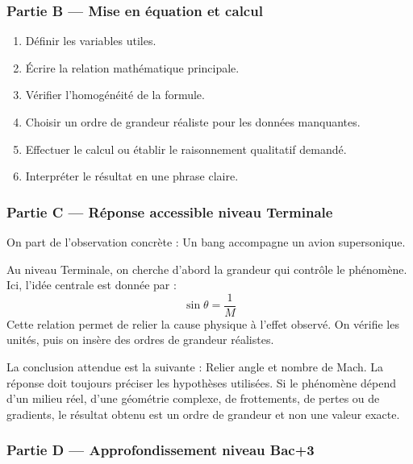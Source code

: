 \documentclass[11pt,a4paper]{article}
\begin{document}
\subsubsection*{Partie B — Mise en équation et calcul}

\begin{enumerate}
  \item Définir les variables utiles.
  \item Écrire la relation mathématique principale.
  \item Vérifier l'homogénéité de la formule.
  \item Choisir un ordre de grandeur réaliste pour les données manquantes.
  \item Effectuer le calcul ou établir le raisonnement qualitatif demandé.
  \item Interpréter le résultat en une phrase claire.
\end{enumerate}

\subsubsection*{Partie C — Réponse accessible niveau Terminale}

\begin{corrigebox}
On part de l'observation concrète : Un bang accompagne un avion supersonique.

Au niveau Terminale, on cherche d'abord la grandeur qui contrôle le phénomène. Ici, l'idée centrale est donnée par :
\[
\sin\theta=\frac1M
\]
Cette relation permet de relier la cause physique à l'effet observé. On vérifie les unités, puis on insère des ordres de grandeur réalistes.

La conclusion attendue est la suivante : Relier angle et nombre de Mach. La réponse doit toujours préciser les hypothèses utilisées. Si le phénomène dépend d'un milieu réel, d'une géométrie complexe, de frottements, de pertes ou de gradients, le résultat obtenu est un ordre de grandeur et non une valeur exacte.
\end{corrigebox}

\subsubsection*{Partie D — Approfondissement niveau Bac+3}
\end{document}
